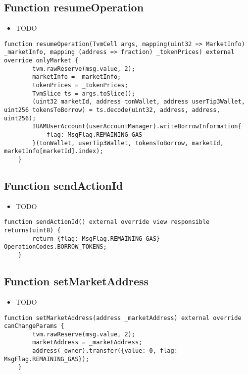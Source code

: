 \subsection{Function resumeOperation}

\noindent\begin{itemize}
\item TODO
\end{itemize}

\begin{lstlisting}[firstnumber=164]
    function resumeOperation(TvmCell args, mapping(uint32 => MarketInfo) _marketInfo, mapping (address => fraction) _tokenPrices) external override onlyMarket {
        tvm.rawReserve(msg.value, 2);
        marketInfo = _marketInfo;
        tokenPrices = _tokenPrices;
        TvmSlice ts = args.toSlice();
        (uint32 marketId, address tonWallet, address userTip3Wallet, uint256 tokensToBorrow) = ts.decode(uint32, address, address, uint256);
        IUAMUserAccount(userAccountManager).writeBorrowInformation{
            flag: MsgFlag.REMAINING_GAS
        }(tonWallet, userTip3Wallet, tokensToBorrow, marketId, marketInfo[marketId].index);
    }
\end{lstlisting}

\subsection{Function sendActionId}

\noindent\begin{itemize}
\item TODO
\end{itemize}

\begin{lstlisting}[firstnumber=57]
    function sendActionId() external override view responsible returns(uint8) {
        return {flag: MsgFlag.REMAINING_GAS} OperationCodes.BORROW_TOKENS;
    }
\end{lstlisting}

\subsection{Function setMarketAddress}

\noindent\begin{itemize}
\item TODO
\end{itemize}

\begin{lstlisting}[firstnumber=65]
    function setMarketAddress(address _marketAddress) external override canChangeParams {
        tvm.rawReserve(msg.value, 2);
        marketAddress = _marketAddress;
        address(_owner).transfer({value: 0, flag: MsgFlag.REMAINING_GAS});
    }
\end{lstlisting}

